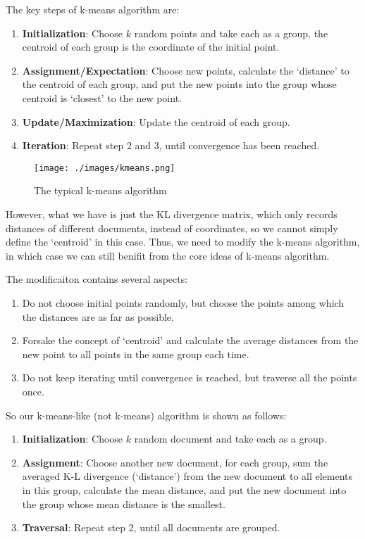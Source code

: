 \documentclass[a4paper, 12pt]{article}
\begin{document}
The key steps of k-means algorithm are:

\begin{enumerate}
    \item \textbf{Initialization}: Choose $k$ random points and take each as a group, the centroid of each group is the coordinate of the initial point.
    \item \textbf{Assignment/Expectation}: Choose new points, calculate the `distance' to the centroid of each group, and put the new points into the group whose centroid is `closest' to the new point.
    \item \textbf{Update/Maximization}: Update the centroid of each group.
    \item \textbf{Iteration}: Repeat step 2 and 3, until convergence has been reached.
\end{enumerate}

\begin{figure}[htbp]
\centering
\texttt{[image: ./images/kmeans.png]}
\caption{The typical k-means algorithm}
\end{figure}
However, what we have is just the KL divergence matrix, which only records distances of different documents, instead of coordinates, so we cannot simply define the `centroid' in this case. Thus, we need to modify the k-means algorithm, in which case we can still benifit from the core ideas of k-means algorithm.

\newpage
The modificaiton contains several aspects:
\begin{enumerate}
\item Do not choose initial points randomly, but choose the points among which the distances are as far as possible.
\item Forsake the concept of `centroid' and calculate the average distances from the new point to all points in the same group each time. 
\item Do not keep iterating until convergence is reached, but traverse all the points once.
\end{enumerate}

So our k-means-like (not k-means) algorithm is shown as follows:

\begin{enumerate}
    \item \textbf{Initialization}: Choose $k$ random document and take each as a group.
    \item \textbf{Assignment}: Choose another new document, for each group, sum the averaged K-L divergence (`distance') from the new document to all elements in this group, calculate the mean distance, and put the new document into the group whose mean distance is the smallest.
    \item \textbf{Traversal}: Repeat step 2, until all documents are grouped.
\end{enumerate}
\end{document}
